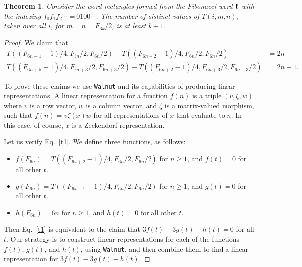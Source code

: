 \documentclass[final]{dmtcs-episciences}
\theoremstyle{plain}
\newtheorem{theorem}{Theorem}
\theoremstyle{remark}
\begin{document}
\begin{theorem}
Consider the word rectangles formed from the Fibonacci word $\bf f$ with the indexing $f_0 f_1 f_2 \cdots\allowbreak = 0100\cdots$.
The number of distinct values
of $T(i,m,n)$, taken over all $i$,
for $m = n = F_{3k}/2$, is at least
$k+1$.
\label{bnd}
\end{theorem}

\begin{proof}
We claim that
\begin{align}
T (( F_{6n-1}-1)/4, F_{6n}/2, F_{6n}/2)  - T( (F_{6n+2}-1)/4, F_{6n}/2, F_{6n}/2) &= 2n \label{t1} \\
T((F_{6n+5}-1)/4, F_{6n+3}/2, F_{6n+3}/2) - T((F_{6n+2}-1)/4, F_{6n+3}/2, F_{6n+3}/2) &= 2n+1. \label{t2}
\end{align}

To prove these claims we use {\tt Walnut} and its capabilities of producing linear representations.   A linear representation for a function $f(n)$ is a triple $(v,\zeta, w)$ where $v$ is a row vector, $w$ is a column vector, and $\zeta$ is a matrix-valued morphism, such that $f(n) = v \zeta(x) w$ for all representations of $x$ that evaluate to $n$.  In this case, of course, $x$ is a Zeckendorf representation. 

Let us verify Eq.~\eqref{t1}.  We define three functions, as follows:
\begin{itemize}
    \item  $f(F_{6n}) = T( (F_{6n+2}-1)/4, F_{6n}/2, F_{6n}/2)$ for $n \geq 1$,
    and $f(t)= 0$ for all other $t$.

    \item  $g(F_{6n}) = T (( F_{6n-1}-1)/4, F_{6n}/2, F_{6n}/2)$ for $n \geq 1$,
    and $g(t)= 0$ for all other $t$.

    \item $h(F_{6n}) = 6n$
    for $n \geq 1$, and $h(t)= 0$ for all other $t$.
\end{itemize}
Then Eq.~\eqref{t1} is equivalent to the claim that $3f(t)-3g(t)-h(t) = 0$ for all $t$.  Our strategy is to construct linear representations for each of the functions $f(t)$, $g(t)$, and $h(t)$, using {\tt Walnut}, and then combine them to find a linear representation for
$3f(t)-3g(t)-h(t)$.



\end{proof}
\end{document}
